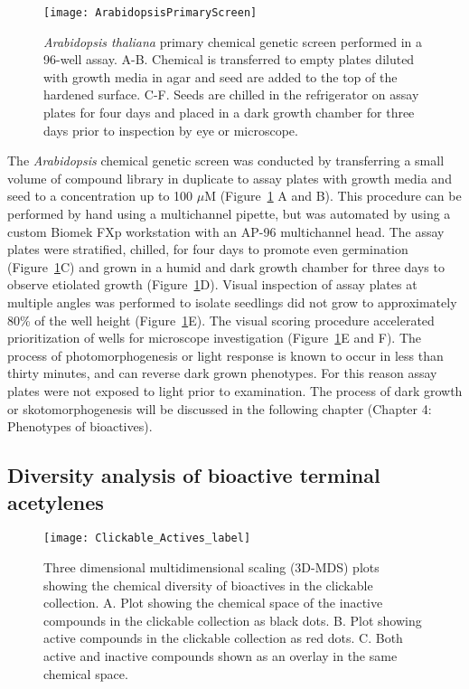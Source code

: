 \begin{figure}
\texttt{[image: ArabidopsisPrimaryScreen]}
\caption{{\it Arabidopsis thaliana} primary chemical genetic screen performed in a 96-well assay. A-B. Chemical is transferred to empty plates diluted with growth media in agar and seed are added to the top of the hardened surface. C-F. Seeds are chilled in the refrigerator on assay plates for four days and placed in a dark growth chamber for three days prior to inspection by eye or microscope.}
\label{fig:ArabidopsisPrimaryScreen}
\end{figure}

The {\it Arabidopsis} chemical genetic screen was conducted by transferring a small volume of compound library in duplicate to assay plates with growth media and seed to a concentration up to 100 $\mu$M (Figure~\ref{fig:ArabidopsisPrimaryScreen} A and B). This procedure can be performed by hand using a multichannel pipette, but was automated by using a custom Biomek FXp workstation with an AP-96 multichannel head. The assay plates were stratified, chilled, for four days to promote even germination (Figure~\ref{fig:ArabidopsisPrimaryScreen}C) and grown in a humid and dark growth chamber for three days to observe etiolated growth (Figure~\ref{fig:ArabidopsisPrimaryScreen}D). Visual inspection of assay plates at multiple angles was performed to isolate seedlings did not grow to approximately 80{\%} of the well height (Figure~\ref{fig:ArabidopsisPrimaryScreen}E)\cite{Zhao_Hyr1}. The visual scoring procedure accelerated prioritization of wells for microscope investigation (Figure~\ref{fig:ArabidopsisPrimaryScreen}E and F). The process of photomorphogenesis or light response is known to occur in less than thirty minutes, and can reverse dark grown phenotypes. For this reason assay plates were not exposed to light prior to examination. The process of dark growth or skotomorphogenesis will be discussed in the following chapter (Chapter 4: Phenotypes of bioactives).

\subsection{Diversity analysis of bioactive terminal acetylenes}

\begin{figure}
\centering
\texttt{[image: Clickable\_Actives\_label]}
\caption{Three dimensional multidimensional scaling (3D-MDS) plots showing the chemical diversity of bioactives in the clickable collection. A. Plot showing the chemical space of the inactive compounds in the clickable collection as black dots. B. Plot showing active compounds in the clickable collection as red dots. C. Both active and inactive compounds shown as an overlay in the same chemical space.}
\label{fig:2D_MDS_AA}
\end{figure}

